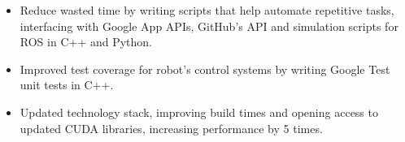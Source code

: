 \documentclass[10pt,a4paper,ragged2e,withhyper]{altacv}
\begin{document}
\begin{paracol}{2}







  \begin{itemize}
    \item Reduce wasted time by writing scripts that help automate repetitive tasks, interfacing with Google App APIs, GitHub’s API and simulation scripts for ROS in C++ and Python.
    \item Improved test coverage for robot’s control systems by writing Google Test unit tests in C++.
    \item Updated technology stack, improving build times and opening access to updated CUDA libraries, increasing performance by 5 times.
  \end{itemize}
  \divider\small
\end{paracol}
\end{document}
